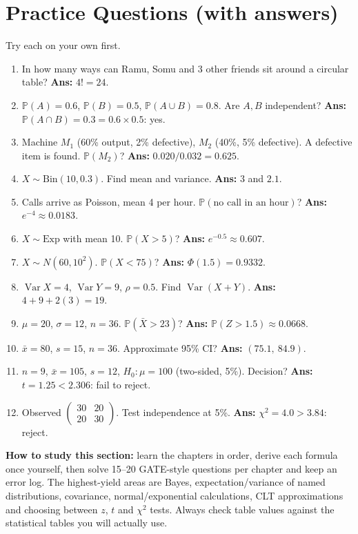 \documentclass[11pt,a4paper]{article}
\newcommand{\Var}{\operatorname{Var}}
\renewcommand{\Pr}{\mathbb{P}}
\begin{document}
\section{Practice Questions (with answers)}
Try each on your own first.
\begin{enumerate}[leftmargin=*,itemsep=4pt]
\item In how many ways can Ramu, Somu and 3 other friends sit around a circular table? \hfill \textbf{Ans: } $4!=24$.
\item $\Pr(A)=0.6$, $\Pr(B)=0.5$, $\Pr(A\cup B)=0.8$. Are $A,B$ independent? \hfill \textbf{Ans: } $\Pr(A\cap B)=0.3=0.6\times0.5$: yes.
\item Machine $M_1$ (60\% output, 2\% defective), $M_2$ (40\%, 5\% defective). A defective item is found. $\Pr(M_2)$? \hfill \textbf{Ans: } $0.020/0.032=0.625$.
\item $X\sim\text{Bin}(10,0.3)$. Find mean and variance. \hfill \textbf{Ans: } $3$ and $2.1$.
\item Calls arrive as Poisson, mean 4 per hour. $\Pr(\text{no call in an hour})$? \hfill \textbf{Ans: } $e^{-4}\approx0.0183$.
\item $X\sim\text{Exp}$ with mean 10. $\Pr(X>5)$? \hfill \textbf{Ans: } $e^{-0.5}\approx0.607$.
\item $X\sim N(60,10^2)$. $\Pr(X<75)$? \hfill \textbf{Ans: } $\Phi(1.5)=0.9332$.
\item $\Var X=4$, $\Var Y=9$, $\rho=0.5$. Find $\Var(X+Y)$. \hfill \textbf{Ans: } $4+9+2(3)=19$.
\item $\mu=20$, $\sigma=12$, $n=36$. $\Pr(\bar X>23)$? \hfill \textbf{Ans: } $\Pr(Z>1.5)\approx0.0668$.
\item $\bar x=80$, $s=15$, $n=36$. Approximate 95\% CI? \hfill \textbf{Ans: } $(75.1,\ 84.9)$.
\item $n=9$, $\bar x=105$, $s=12$, $H_0:\mu=100$ (two-sided, 5\%). Decision? \hfill \textbf{Ans: } $t=1.25<2.306$: fail to reject.
\item Observed $\begin{pmatrix}30&20\\20&30\end{pmatrix}$. Test independence at 5\%. \hfill \textbf{Ans: } $\chi^2=4.0>3.84$: reject.
\end{enumerate}

\vspace{1em}
\textbf{How to study this section:} learn the chapters in order, derive each formula once yourself, then solve 15--20 GATE-style questions per chapter and keep an error log. The highest-yield areas are Bayes, expectation/variance of named distributions, covariance, normal/exponential calculations, CLT approximations and choosing between $z$, $t$ and $\chi^2$ tests. Always check table values against the statistical tables you will actually use.
\end{document}
